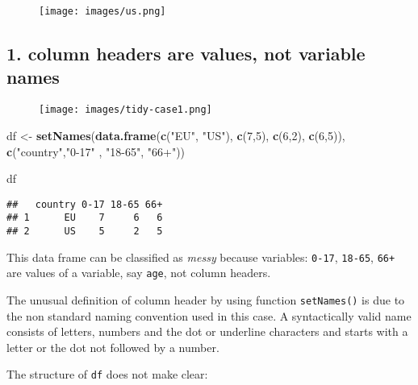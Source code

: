 \documentclass[]{book}
\newenvironment{Shaded}{\begin{snugshade}}{\end{snugshade}}
\newcommand{\KeywordTok}[1]{\textcolor[rgb]{0.13,0.29,0.53}{\textbf{{#1}}}}
\newcommand{\DecValTok}[1]{\textcolor[rgb]{0.00,0.00,0.81}{{#1}}}
\newcommand{\StringTok}[1]{\textcolor[rgb]{0.31,0.60,0.02}{{#1}}}
\newcommand{\NormalTok}[1]{{#1}}
\begin{document}
\begin{figure}[htbp]
\centering
\texttt{[image: images/us.png]}
\caption{}
\end{figure}

\clearpage

\subsection{1. column headers are values, not variable
names}\label{column-headers-are-values-not-variable-names}

\begin{figure}[htbp]
\centering
\texttt{[image: images/tidy-case1.png]}
\caption{}
\end{figure}

\begin{Shaded}
\begin{Highlighting}[]
\NormalTok{df <-}\StringTok{ }\KeywordTok{setNames}\NormalTok{(}\KeywordTok{data.frame}\NormalTok{(}\KeywordTok{c}\NormalTok{(}\StringTok{"EU"}\NormalTok{, }\StringTok{"US"}\NormalTok{), }\KeywordTok{c}\NormalTok{(}\DecValTok{7}\NormalTok{,}\DecValTok{5}\NormalTok{), }\KeywordTok{c}\NormalTok{(}\DecValTok{6}\NormalTok{,}\DecValTok{2}\NormalTok{), }\KeywordTok{c}\NormalTok{(}\DecValTok{6}\NormalTok{,}\DecValTok{5}\NormalTok{)),}
               \KeywordTok{c}\NormalTok{(}\StringTok{"country"}\NormalTok{,}\StringTok{"0-17"} \NormalTok{, }\StringTok{"18-65"}\NormalTok{, }\StringTok{"66+"}\NormalTok{))}

\NormalTok{df}
\end{Highlighting}
\end{Shaded}

\begin{verbatim}
##   country 0-17 18-65 66+
## 1      EU    7     6   6
## 2      US    5     2   5
\end{verbatim}

This data frame can be classified as \emph{messy} because variables:
\texttt{0-17}, \texttt{18-65}, \texttt{66+} are values of a variable,
say \texttt{age}, not column headers.

The unusual definition of column header by using function
\texttt{setNames()} is due to the non standard naming convention used in
this case. A syntactically valid name consists of letters, numbers and
the dot or underline characters and starts with a letter or the dot not
followed by a number.

The structure of \texttt{df} does not make clear:
\end{document}
